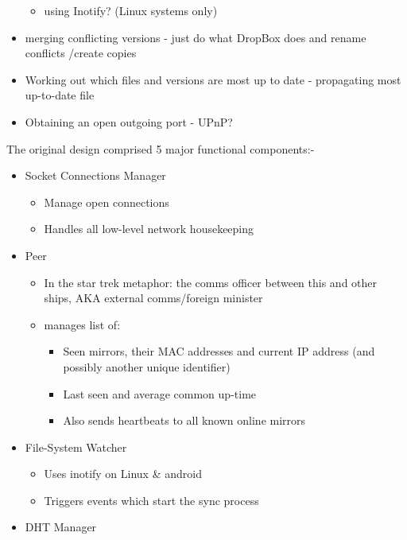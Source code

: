 \documentclass[12pt,a4paper,]{adreport}
\begin{document}
\begin{itemize}
  \begin{itemize}
  \itemsep1pt\parskip0pt
  \item
    using Inotify? (Linux systems only)
  \end{itemize}
\item
  merging conflicting versions - just do what DropBox does and rename
  conflicts /create copies
\item
  Working out which files and versions are most up to date - propagating
  most up-to-date file
\item
  Obtaining an open outgoing port - UPnP?
\end{itemize}

The original design comprised 5 major functional components:-

\begin{itemize}
\itemsep1pt\parskip0pt
\item
  Socket Connections Manager

  \begin{itemize}
  \itemsep1pt\parskip0pt
  \item
    Manage open connections
  \item
    Handles all low-level network housekeeping
  \end{itemize}
\item
  Peer

  \begin{itemize}
  \itemsep1pt\parskip0pt
  \item
    In the star trek metaphor: the comms officer between this and other
    ships, AKA external comms/foreign minister
  \item
    manages list of:

    \begin{itemize}
    \itemsep1pt\parskip0pt
    \item
      Seen mirrors, their MAC addresses and current IP address (and
      possibly another unique identifier)
    \item
      Last seen and average common up-time
    \item
      Also sends heartbeats to all known online mirrors
    \end{itemize}
  \end{itemize}
\item
  File-System Watcher

  \begin{itemize}
  \itemsep1pt\parskip0pt
  \item
    Uses inotify on Linux \& android
  \item
    Triggers events which start the sync process
  \end{itemize}
\item
  DHT Manager


\end{itemize}
\end{document}
